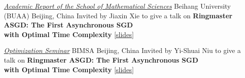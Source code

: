 \documentclass[10pt,a4paper,sans]{moderncv}        %
\newcommand{\red}{\color{cherry}}
\newcommand{\kaust}{KAUST}
\newcommand{\yerevan}{Yerevan, Armenia}
\newcommand{\thuwal}{Thuwal, Saudi Arabia}
\newcommand{\highlight}[1]{{\red #1}}
\begin{document}



    {\textcolor{accent}{\href{https://math.buaa.edu.cn/info/1296/6437.htm}{\textit{Academic Report of the School of Mathematical Sciences}}}}
    {Beihang University (BUAA)}
    {Beijing, China}
    {}
    {
      Invited by \highlight{Jiaxin Xie} to give a talk on \textbf{Ringmaster ASGD: The First Asynchronous SGD\\
      with Optimal Time Complexity} [{\href{https://artomaranjyan.github.io/assets/pdf/Ringmaster_BUAA.pdf}{slides}}]
    }

    {\textcolor{accent}{\href{https://artomaranjyan.github.io/assets/pdf/BIMSA_talk_announcment.jpg}{\textit{Optimization Seminar}}}}
    {BIMSA}
    {Beijing, China}
    {}
    {
      Invited by \highlight{Yi-Shuai Niu} to give a talk on \textbf{Ringmaster ASGD: The First Asynchronous SGD\\
      with Optimal Time Complexity} [{\href{https://artomaranjyan.github.io/assets/pdf/Ringmaster_BIMSA.pdf}{slides}}]
    }
\end{document}
